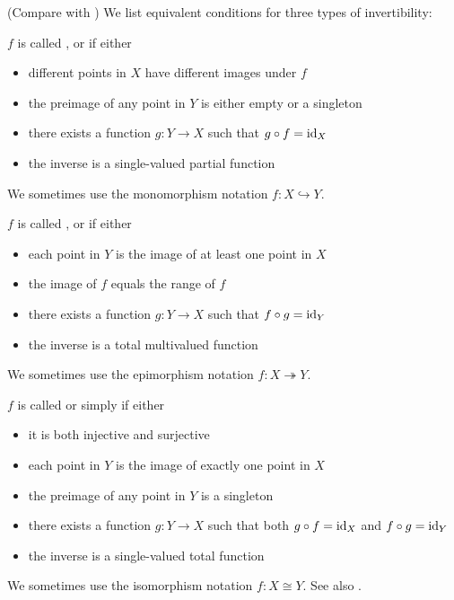\begin{definition}\label{def:function_invertibility}(Compare with )
  We list equivalent conditions for three types of invertibility:
  \begin{defenum}
     \( f \) is called ,  or  if either
    \begin{itemize}
      \item different points in \( X \) have different images under \( f \)
      \item the preimage of any point in \( Y \) is either empty or a singleton
      \item there exists a function \( g: Y \to X \) such that \( g \circ f = \operatorname{id}_X \)
      \item the inverse is a single-valued partial function
    \end{itemize}

    We sometimes use the monomorphism notation \( f: X \hookrightarrow Y \).

     \( f \) is called ,  or  if either
    \begin{itemize}
      \item each point in \( Y \) is the image of at least one point in \( X \)
      \item the image of \( f \) equals the range of \( f \)
      \item there exists a function \( g: Y \to X \) such that \( f \circ g = \operatorname{id}_Y \)
      \item the inverse is a total multivalued function
    \end{itemize}

    We sometimes use the epimorphism notation \( f: X \twoheadrightarrow Y \).

     \( f \) is called  or simply  if either
    \begin{itemize}
      \item it is both injective and surjective
      \item each point in \( Y \) is the image of exactly one point in \( X \)
      \item the preimage of any point in \( Y \) is a singleton
      \item there exists a function \( g: Y \to X \) such that both \( g \circ f = \operatorname{id}_X \) and \( f \circ g = \operatorname{id}_Y \)
      \item the inverse is a single-valued total function
    \end{itemize}

    We sometimes use the isomorphism notation \( f: X \cong Y \). See also .
  \end{defenum}
\end{definition}

